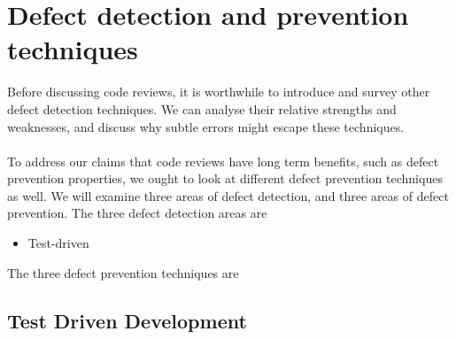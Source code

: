 \chapter{Defect detection and prevention techniques}
\label{chap:otherdets}

Before discussing code reviews, it is worthwhile to introduce and survey other defect
detection techniques.
We can analyse their relative strengths and weaknesses, and discuss why subtle
errors might escape these techniques.\\
\\
To address our claims that code reviews have long term benefits, such as defect
prevention properties, we ought to look at different defect prevention
techniques as well.
We will examine three areas of defect detection, and three areas of defect
prevention.
The three defect detection areas are
\begin{itemize}
  \item Test-driven
\end{itemize}
The three defect prevention techniques are
\begin{itemize}

\end{itemize}

\section{Test Driven Development} \label{sec:otherdets:testDD}

